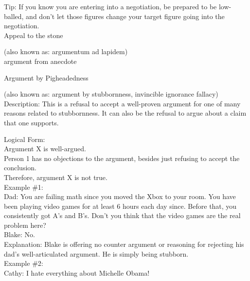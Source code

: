 \documentclass[a4paper,12pt,single,pdftex]{scrartcl}
\begin{document}
    
      Tip: If you know you are entering into a negotiation, be prepared to be low-balled, and don’t let those figures change your target figure going into the negotiation. 
    \\

  

Appeal to the stone
    
      (also known as: argumentum ad lapidem)
    \\

  

argument from anecdote

Argument by Pigheadedness
    
      (also known as: argument by stubbornness, invincible ignorance fallacy)
    \\

  
    Description: This is a refusal to accept a well-proven argument for one of many reasons related to stubbornness. It can also be the refusal to argue about a claim that one supports.

    
      Logical Form:
    \\

    
      Argument X is well-argued.
    \\

    
      Person 1 has no objections to the argument, besides just refusing to accept the conclusion.
    \\

    
      Therefore, argument X is not true.
    \\

    
      Example \#1:
    \\

    
      Dad: You are failing math since you moved the Xbox to your room. You have been playing video games for at least 6 hours each day since. Before that, you consistently got A's and B's. Don't you think that the video games are the real problem here?
    \\

    
      Blake: No.
    \\

    
      Explanation: Blake is offering no counter argument or reasoning for rejecting his dad's well-articulated argument. He is simply being stubborn.
    \\

    
      Example \#2:
    \\

    
      Cathy: I hate everything about Michelle Obama!
    \\
\end{document}
